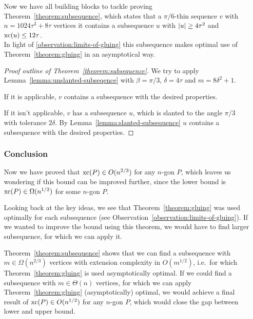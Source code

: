 Now we have all building blocks to tackle proving Theorem~\ref{theorem:subsequence}, which states that a $\pi/6$-thin sequence $v$ with $n = 1024\tau^3 + 8\tau$ vertices it contains a subsequence $u$ with $\lvert u\rvert \geq 4\tau^2$ and $\operatorname{xc}(u) \leq 12\tau$.\\
In light of \ref{observation:limits-of-gluing} this subsequence makes optimal use of Theorem~\ref{theorem:gluing} in an asymptotical way.

\begin{proof}[Proof outline of Theorem~\ref{theorem:subsequence}]
  We try to apply Lemma~\ref{lemma:unslanted-subseqence} with $\beta = \pi/3$, $\delta = 4\tau$ and $m = 8\delta^2 + 1$.

  If it is applicable, $v$ contains a subsequence with the desired properties.

  If it isn't applicable, $v$ has a subsequence $u$, which is slanted to the angle $\pi/3$ with tolerance $2\delta$. By Lemma~\ref{lemma:slanted-subsequence} $u$ contains a subsequence with the desired properties.
\end{proof}



\subsubsection{Conclusion}

Now we have proved that $\operatorname{xc}(P) \in O(n^{2/3})$ for any $n$-gon $P$, which leaves us wondering if this bound can be improved further, since the lower bound is $\operatorname{xc}(P) \in \Omega(n^{1/2})$ for some $n$-gon $P$.

Looking back at the key ideas, we see that Theorem~\ref{theorem:gluing} was used optimally for each subsequence (see Observation~\ref{observation:limits-of-gluing}). If we wanted to improve the bound using this theorem, we would have to find larger subsequence, for which we can apply it.

Theorem~\ref{theorem:subsequence} shows that we can find a subsequence with $m \in \Omega(n^{2/3})$ vertices with extension complexity in $O(m^{1/2})$, i.e.\ for which Theorem~\ref{theorem:gluing} is used asymptotically optimal. If we could find a subsequence with $m \in \Theta(n)$ vertices, for which we can apply Theorem~\ref{theorem:gluing} (asymptotically) optimal, we would achieve a final result of $\operatorname{xc}(P) \in O(n^{1/2})$ for any $n$-gon $P$, which would close the gap between lower and upper bound.


